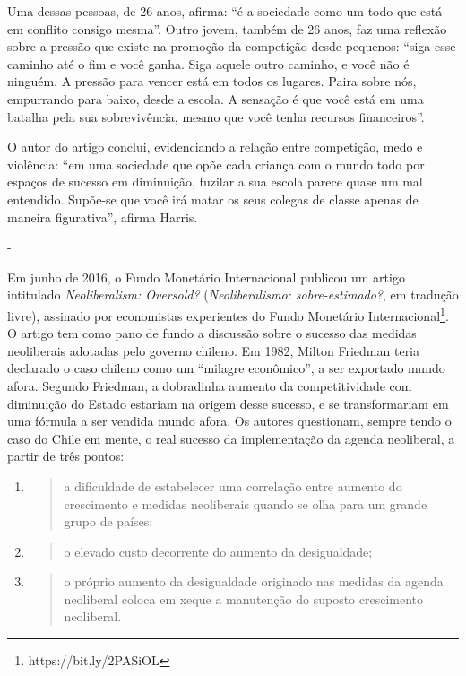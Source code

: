 Uma dessas pessoas, de 26 anos, afirma: ``é a sociedade como um
todo que está em conflito consigo mesma''. Outro jovem, também de 26
anos, faz uma reflexão sobre a pressão que existe na promoção da
competição desde pequenos: ``siga esse caminho até o fim e você ganha.
Siga aquele outro caminho, e você não é ninguém. A pressão para vencer
está em todos os lugares. Paira sobre nós, empurrando para baixo, desde
a escola. A sensação é que você está em uma batalha pela sua
sobrevivência, mesmo que você tenha recursos
financeiros''.

O autor do artigo conclui, evidenciando a relação entre
competição, medo e violência: ``em uma sociedade que opõe cada criança
com o mundo todo por espaços de sucesso em diminuição, fuzilar a sua
escola parece quase um mal entendido. Supõe-se que você irá matar os
seus colegas de classe apenas de maneira figurativa'', afirma
Harris.

-

Em junho de 2016, o Fundo Monetário Internacional publicou um artigo
intitulado \emph{Neoliberalism: Oversold?} (\emph{Neoliberalismo:
sobre-estimado?}, em tradução livre), assinado por economistas
experientes do Fundo Monetário Internacional\footnote{https://bit.ly/2PASiOL}.
O artigo tem como pano de fundo a discussão sobre o sucesso das medidas
neoliberais adotadas pelo governo chileno. Em 1982, Milton Friedman
teria declarado o caso chileno como um ``milagre econômico'', a ser
exportado mundo afora. Segundo Friedman, a dobradinha aumento da
competitividade com diminuição do Estado estariam na origem desse
sucesso, e se transformariam em uma fórmula a ser vendida mundo afora.
Os autores questionam, sempre tendo o caso do Chile em mente, o real
sucesso da implementação da agenda neoliberal, a partir de três pontos:

\begin{enumerate}
\def\labelenumi{\alph{enumi})}
\item
  \begin{quote}
  a dificuldade de estabelecer uma correlação entre aumento do
  crescimento e medidas neoliberais quando se olha para um grande grupo
  de países;
  \end{quote}
\item
  \begin{quote}
  o elevado custo decorrente do aumento da desigualdade;
  \end{quote}
\item
  \begin{quote}
  o próprio aumento da desigualdade originado nas medidas da agenda
  neoliberal coloca em xeque a manutenção do suposto crescimento
  neoliberal.
  \end{quote}
\end{enumerate}

